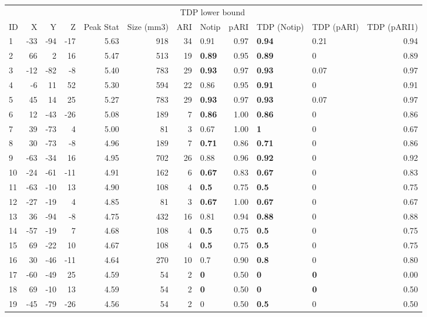 
\begin{tabular}{lrrrrrrlrllr}
\toprule
\multicolumn{6}{c}{ } & \multicolumn{3}{c}{TDP lower bound} \\
\cmidrule(l{3pt}r{3pt}){7-9}
ID & X & Y & Z & Peak Stat & Size (mm3) & ARI & Notip & pARI & TDP (Notip) & TDP (pARI) & TDP (pARI1)\\
\midrule
1 & -33 & -94 & -17 & 5.63 & 918 & 34 & 0.91 & 0.97 & \textbf{0.94} & 0.21 & 0.94\\
2 & 66 & 2 & 16 & 5.47 & 513 & 19 & \textbf{0.89} & 0.95 & \textbf{0.89} & 0 & 0.89\\
3 & -12 & -82 & -8 & 5.40 & 783 & 29 & \textbf{0.93} & 0.97 & \textbf{0.93} & 0.07 & 0.97\\
4 & -6 & 11 & 52 & 5.30 & 594 & 22 & 0.86 & 0.95 & \textbf{0.91} & 0 & 0.91\\
5 & 45 & 14 & 25 & 5.27 & 783 & 29 & \textbf{0.93} & 0.97 & \textbf{0.93} & 0.07 & 0.97\\
6 & 12 & -43 & -26 & 5.08 & 189 & 7 & \textbf{0.86} & 1.00 & \textbf{0.86} & 0 & 0.86\\
7 & 39 & -73 & 4 & 5.00 & 81 & 3 & 0.67 & 1.00 & \textbf{1} & 0 & 0.67\\
8 & 30 & -73 & -8 & 4.96 & 189 & 7 & \textbf{0.71} & 0.86 & \textbf{0.71} & 0 & 0.86\\
9 & -63 & -34 & 16 & 4.95 & 702 & 26 & 0.88 & 0.96 & \textbf{0.92} & 0 & 0.92\\
10 & -24 & -61 & -11 & 4.91 & 162 & 6 & \textbf{0.67} & 0.83 & \textbf{0.67} & 0 & 0.83\\
11 & -63 & -10 & 13 & 4.90 & 108 & 4 & \textbf{0.5} & 0.75 & \textbf{0.5} & 0 & 0.75\\
12 & -27 & -19 & 4 & 4.85 & 81 & 3 & \textbf{0.67} & 1.00 & \textbf{0.67} & 0 & 0.67\\
13 & 36 & -94 & -8 & 4.75 & 432 & 16 & 0.81 & 0.94 & \textbf{0.88} & 0 & 0.88\\
14 & -57 & -19 & 7 & 4.68 & 108 & 4 & \textbf{0.5} & 0.75 & \textbf{0.5} & 0 & 0.75\\
15 & 69 & -22 & 10 & 4.67 & 108 & 4 & \textbf{0.5} & 0.75 & \textbf{0.5} & 0 & 0.75\\
16 & 30 & -46 & -11 & 4.64 & 270 & 10 & 0.7 & 0.90 & \textbf{0.8} & 0 & 0.80\\
17 & -60 & -49 & 25 & 4.59 & 54 & 2 & \textbf{0} & 0.50 & \textbf{0} & \textbf{0} & 0.00\\
18 & 69 & -10 & 13 & 4.59 & 54 & 2 & \textbf{0} & 0.50 & \textbf{0} & \textbf{0} & 0.50\\
19 & -45 & -79 & -26 & 4.56 & 54 & 2 & 0 & 0.50 & \textbf{0.5} & 0 & 0.50\\
\bottomrule
\end{tabular}
